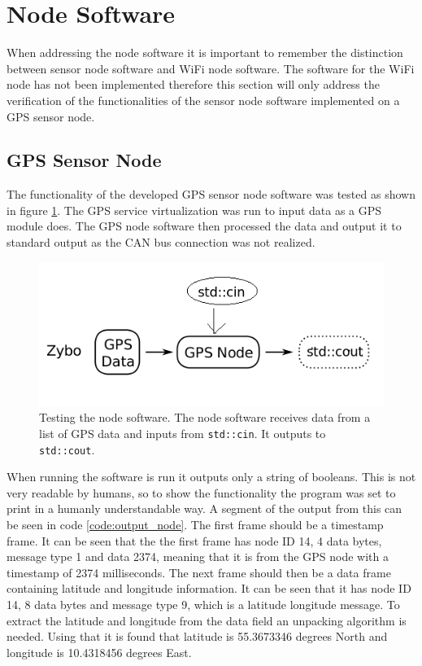 \section{Node Software}
\label{sec:node_software}
When addressing the node software it is important to remember the distinction between sensor node software and WiFi node software.
The software for the WiFi node has not been implemented therefore this section will only address the verification of the functionalities of the sensor node software implemented on a GPS sensor node.

\subsection{GPS Sensor Node}
The functionality of the developed GPS sensor node software was tested as shown in figure \ref{fig:sensor_gps_veri}.
The GPS service virtualization was run to input data as a GPS module does. 
The GPS node software then processed the data and output it to standard output as the CAN bus connection was not realized.

\begin{figure}[h]
	\centering
	\includegraphics[width = 0.6\linewidth]{graphics/sensor_gps_veri}
	\caption{Testing the node software. The node software receives data from a list of GPS data and inputs from \texttt{std::cin}. It outputs to \texttt{std::cout}.}
	\label{fig:sensor_gps_veri}
\end{figure}

When running the software is run it outputs only a string of booleans. 
This is not very readable by humans, so to show the functionality the program was set to print in a humanly understandable way.
A segment of the output from this can be seen in code \ref{code:output_node}.
The first frame should be a timestamp frame.
It can be seen that the the first frame has node ID 14, 4 data bytes, message type 1 and data 2374, meaning that it is from the GPS node with a timestamp of 2374 milliseconds.
The next frame should then be a data frame containing latitude and longitude information.
It can be seen that it has node ID 14, 8 data bytes and message type 9, which is a latitude longitude message.
To extract the latitude and longitude from the data field an unpacking algorithm is needed.
Using that it is found that latitude is 55.3673346 degrees North and longitude is 10.4318456 degrees East.

